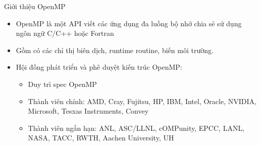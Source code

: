 \documentclass[10pt]{beamer}
\theoremstyle{remark}
\numberwithin{algocf}{section}
\numberwithin{equation}{section}
\numberwithin{dl}{section}
\numberwithin{figure}{section}
\begin{document}
\begin{frame}{Giới thiệu OpenMP}
    \begin{itemize}
        \item OpenMP là một API viết các ứng dụng đa luồng bộ nhớ chia sẻ sử dụng ngôn ngữ C/C++ hoặc Fortran
        \item Gồm có các chỉ thị biên dịch, runtime routine, biến môi trường.
        \item Hội đồng phát triển và phê duyệt kiến trúc OpenMP:
        \begin{itemize}
            \item Duy trì spec OpenMP
            \item Thành viên chính: AMD, Cray, Fujitsu, HP, IBM, Intel, Oracle, NVIDIA, Microsoft, Tesxas Instruments, Convey
            \item Thành viên ngắn hạn: ANL,	ASC/LLNL, cOMPunity, EPCC, LANL, NASA, TACC, RWTH, Aachen University, UH
        \end{itemize}
    \end{itemize}
\end{frame}
\end{document}
